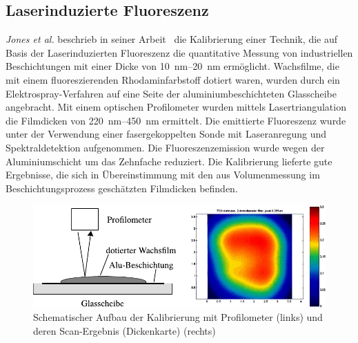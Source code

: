\subsection{Laserinduzierte Fluoreszenz}
\label{sub:laserinduzierte_fluoreszenz}

\textit{Jones et al.} beschrieb in seiner Arbeit~\cite{jones_2001} die Kalibrierung einer Technik, die auf Basis der Laserinduzierten Fluoreszenz die quantitative Messung von industriellen Beschichtungen mit einer Dicke von \SIrange{10}{20}{\nano\meter} ermöglicht.
Wachsfilme, die mit einem fluoreszierenden Rhodaminfarbstoff dotiert waren, wurden durch ein Elektrospray-Verfahren auf eine Seite der aluminiumbeschichteten Glasscheibe angebracht.
Mit einem optischen Profilometer wurden mittels Lasertriangulation die Filmdicken von \SIrange{220}{450}{\nano\meter} ermittelt.
Die emittierte Fluoreszenz wurde unter der Verwendung einer fasergekoppelten Sonde mit Laseranregung und Spektraldetektion aufgenommen.
Die Fluoreszenzemission wurde wegen der Aluminiumschicht um das Zehnfache reduziert.
Die Kalibrierung lieferte gute Ergebnisse, die sich in Übereinstimmung mit den aus Volumenmessung im Beschichtungsprozess geschätzten Filmdicken befinden.

\begin{figure}[htb]
    \centering
    \includegraphics[]{./images/schematic_profilometer_and_scan_result_jones.pdf}
    \caption{Schematischer Aufbau der Kalibrierung mit Profilometer (links) und deren Scan-Ergebnis (Dickenkarte) (rechts)~\cite{jones_2001}}
    \label{fig:aufbau_laserinduzierte_kalibrierung_jones}
\end{figure}
